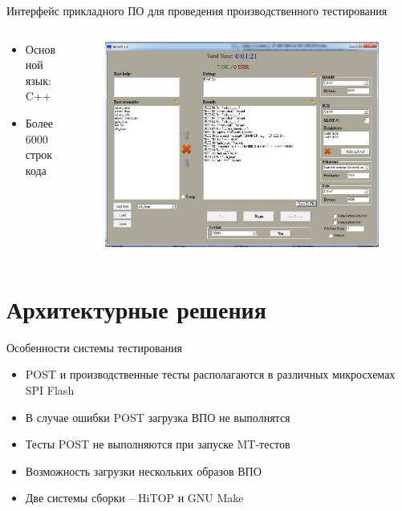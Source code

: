 \documentclass[unicode, notheorems]{beamer}
\begin{document}
\begin{frame}{Интерфейс прикладного ПО для проведения производственного тестирования}
\begin{columns}[c]
\begin{column}{0.45\linewidth}
\begin{itemize}
 \item Основной язык: C++
 \item Более 6000 строк кода
\end{itemize}
\end{column}
\begin{column}{0.63\linewidth}
\begin{figure}[h]
\begin{center}
	\includegraphics[width=1.0\columnwidth]{1206-ok}
\end{center}
\end{figure}
\end{column}
\end{columns}
\end{frame}

\section{Архитектурные решения}
\begin{frame}{Особенности системы тестирования}
 \begin{itemize}
 \item POST и производственные тесты располагаются в различных микросхемах SPI Flash
 \item В случае ошибки POST загрузка ВПО не выполнятся
 \item Тесты POST не выполняются при запуске MT-тестов
 \item Возможность загрузки нескольких образов ВПО
 \item Две системы сборки -- HiTOP и GNU Make
\end{itemize}
\end{frame}
\end{document}
